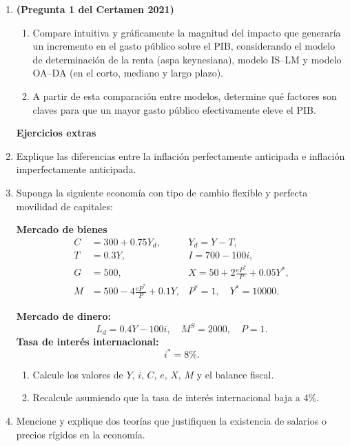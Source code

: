 \documentclass[11pt,addpoints]{article}
\begin{document}
\begin{enumerate}
\item \textbf{(Pregunta 1 del Certamen 2021)}
\begin{enumerate}[label=\alph*)]
\item Compare intuitiva y gráficamente la magnitud del impacto que generaría un incremento en el gasto público sobre el PIB, considerando el modelo de determinación de la renta (aspa keynesiana), modelo IS–LM y modelo OA–DA (en el corto, mediano y largo plazo).

\newpage
\vspace*{0.1cm}
\item A partir de esta comparación entre modelos, determine qué factores son claves para que un mayor gasto público efectivamente eleve el PIB.
\end{enumerate}

\vspace{0.5cm}
\textbf{Ejercicios extras}

\item Explique las diferencias entre la inflación perfectamente anticipada e inflación imperfectamente anticipada.

\item Suponga la siguiente economía con tipo de cambio flexible y perfecta movilidad de capitales:

\textbf{Mercado de bienes}
\[
\begin{aligned}
C &= 300 + 0.75Y_d, &Y_d = Y - T, \\
T &= 0.3Y, &I = 700 - 100i, \\
G &= 500, &X = 50 + 2\frac{eP^*}{P} + 0.05Y^*, \\
M &= 500 - 4\frac{eP^*}{P} + 0.1Y, &P^* = 1, \quad Y^* = 10000.
\end{aligned}
\]

\textbf{Mercado de dinero:}
\[
L_d = 0.4Y - 100i, \quad M^S = 2000, \quad P = 1.
\]
\textbf{Tasa de interés internacional:} 
\[
i^* = 8\%.
\]

\begin{enumerate}[label=\alph*)]
\item Calcule los valores de \(Y,\, i,\, C,\, e,\, X,\, M\) y el balance fiscal. 
\item Recalcule asumiendo que la tasa de interés internacional baja a 4\%.
\end{enumerate}

\item Mencione y explique dos teorías que justifiquen la existencia de salarios o precios rígidos en la economía.
\end{enumerate}
\end{document}
